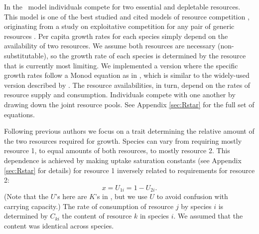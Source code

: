 \documentclass[a4paper,11pt]{article}
\begin{document}
In the \Rstar\ model individuals compete for two essential and
depletable resources. This model is one of the best studied and cited
models of resource competition \citep{Tilman-1977, Tilman-1982,
  Huisman-2001}, originating from a study on exploitative competition
for any pair of generic resources \citep{Leon-1975}. Per capita growth rates for each species simply depend on the availability of two resources.  We assume both
resources are necessary (non-substitutable), so the growth rate
of each species is determined by the resource that is currently most
limiting.  We implemented a version where the specific growth rates
follow a Monod equation as in \citet{Huisman-2001}, which is
similar to the widely-used version described by \citet{Tilman-1977,
  Tilman-1982}.
The resource availabilities, in turn, depend on the rates of resource
supply and consumption. Individuals compete with one another by
drawing down the joint resource pools. See Appendix \ref{sec:Rstar}
for the full set of equations.

Following previous authors \citep{Tilman-1985, Schreiber-2003,
  Fox-2008} we focus on a trait determining the relative amount of the
two resources required for growth. Species can vary from requiring
mostly resource 1, to equal amounts of both resources, to mostly
resource 2. This dependence is achieved by making uptake saturation
constants (see Appendix \ref{sec:Rstar} for details) for resource 1
inversely related to requirements for resource 2:
\begin{equation}
\label{eq:R3}
x = U_{1i} = 1 - U_{2i}.
\end{equation}
(Note that the $U$'s here are $K$'s in \citet{Huisman-2001}, but we
use $U$ to avoid confusion with carrying capacity.)  The rate of
consumption of resource $j$ by species $i$ is determined by $C_{ki}$
the content of resource $k$ in species $i$. We assumed that the
content was identical across species.

%
\end{document}
